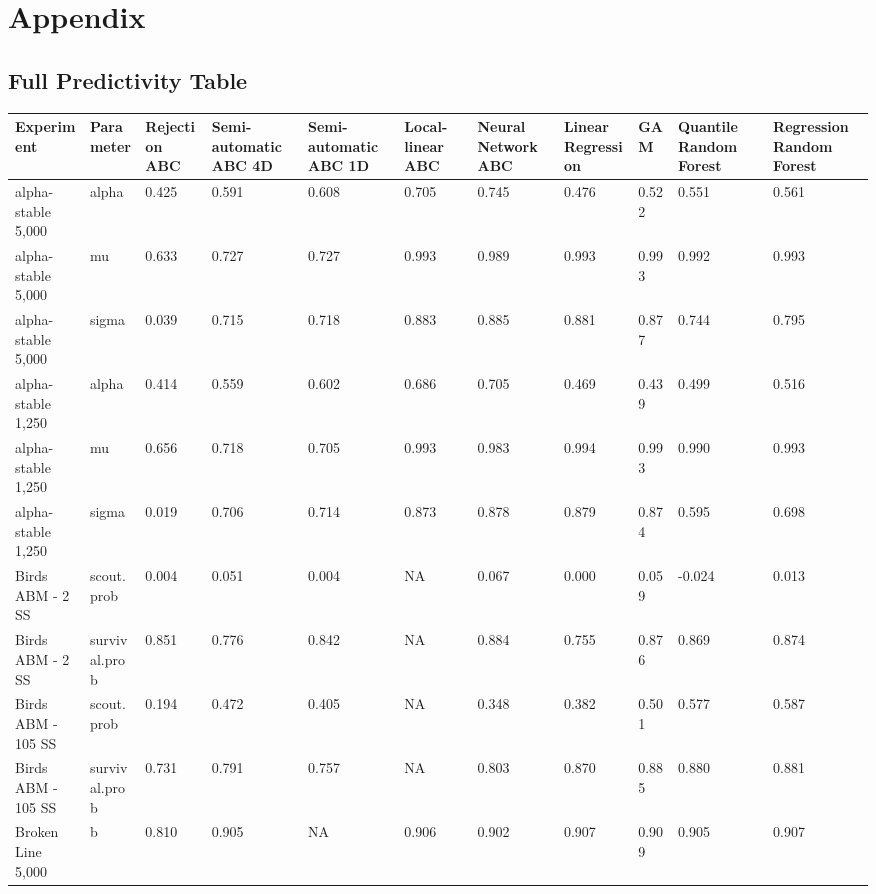 \documentclass[]{article}
\begin{document}
\hypertarget{appendix}{%
\section*{Appendix}\label{appendix}}

\hypertarget{full-predictivity-table}{%
\subsection*{Full Predictivity Table}\label{full-predictivity-table}}

\begin{tabular}{l|l|l|l|l|l|l|l|l|l|l}
\hline
Experiment & Parameter & Rejection ABC & Semi-automatic ABC 4D & Semi-automatic ABC 1D & Local-linear ABC & Neural Network ABC & Linear Regression & GAM & Quantile Random Forest & Regression Random Forest\\
\hline
alpha-stable 5,000 & alpha & 0.425 & 0.591 & 0.608 & 0.705 & 0.745 & 0.476 & 0.522 & 0.551 & 0.561\\
\hline
alpha-stable 5,000 & mu & 0.633 & 0.727 & 0.727 & 0.993 & 0.989 & 0.993 & 0.993 & 0.992 & 0.993\\
\hline
alpha-stable 5,000 & sigma & 0.039 & 0.715 & 0.718 & 0.883 & 0.885 & 0.881 & 0.877 & 0.744 & 0.795\\
\hline
alpha-stable 1,250 & alpha & 0.414 & 0.559 & 0.602 & 0.686 & 0.705 & 0.469 & 0.439 & 0.499 & 0.516\\
\hline
alpha-stable 1,250 & mu & 0.656 & 0.718 & 0.705 & 0.993 & 0.983 & 0.994 & 0.993 & 0.990 & 0.993\\
\hline
alpha-stable 1,250 & sigma & 0.019 & 0.706 & 0.714 & 0.873 & 0.878 & 0.879 & 0.874 & 0.595 & 0.698\\
\hline
Birds ABM - 2 SS & scout.prob & 0.004 & 0.051 & 0.004 & NA & 0.067 & 0.000 & 0.059 & -0.024 & 0.013\\
\hline
Birds ABM - 2 SS & survival.prob & 0.851 & 0.776 & 0.842 & NA & 0.884 & 0.755 & 0.876 & 0.869 & 0.874\\
\hline
Birds ABM - 105 SS & scout.prob & 0.194 & 0.472 & 0.405 & NA & 0.348 & 0.382 & 0.501 & 0.577 & 0.587\\
\hline
Birds ABM - 105 SS & survival.prob & 0.731 & 0.791 & 0.757 & NA & 0.803 & 0.870 & 0.885 & 0.880 & 0.881\\
\hline
Broken Line 5,000 & b & 0.810 & 0.905 & NA & 0.906 & 0.902 & 0.907 & 0.909 & 0.905 & 0.907\\

\end{tabular}
\end{document}
